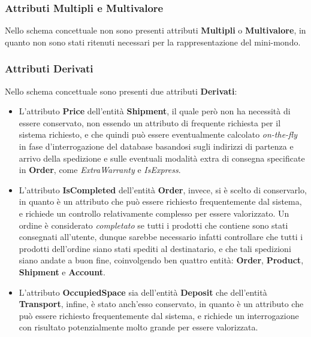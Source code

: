 \subsubsection{Attributi Multipli e Multivalore}

Nello schema concettuale non sono presenti attributi \textbf{Multipli} o \textbf{Multivalore}, in quanto non sono stati ritenuti necessari per la rappresentazione del mini-mondo.

\subsubsection{Attributi Derivati}

Nello schema concettuale sono presenti due attributi \textbf{Derivati}:

\begin{itemize}
  \item L'attributo \textbf{Price} dell'entità \textbf{Shipment}, il quale però non ha necessità di essere conservato, non essendo un attributo di frequente richiesta per il sistema richiesto, e che quindi può essere eventualmente calcolato \textit{on-the-fly} in fase d'interrogazione del database basandosi sugli indirizzi di partenza e arrivo della spedizione e sulle eventuali modalità extra di consegna specificate in \textbf{Order}, come \textit{ExtraWarranty} e \textit{IsExpress}.
  \item L'attributo \textbf{IsCompleted} dell'entità \textbf{Order}, invece, si è scelto di conservarlo, in quanto è un attributo che può essere richiesto frequentemente dal sistema, e richiede un controllo relativamente complesso per essere valorizzato. Un ordine è considerato \textit{completato} se tutti i prodotti che contiene sono stati consegnati all'utente, dunque sarebbe necessario infatti controllare che tutti i prodotti dell'ordine siano stati spediti al destinatario, e che tali spedizioni siano andate a buon fine, coinvolgendo ben quattro entità: \textbf{Order}, \textbf{Product}, \textbf{Shipment} e \textbf{Account}. %
  \item L'attributo \textbf{OccupiedSpace} sia dell'entità \textbf{Deposit} che dell'entità \textbf{Transport}, infine, è stato anch'esso conservato, in quanto è un attributo che può essere richiesto frequentemente dal sistema, e richiede un interrogazione con risultato potenzialmente molto grande per essere valorizzata. %
\end{itemize}

